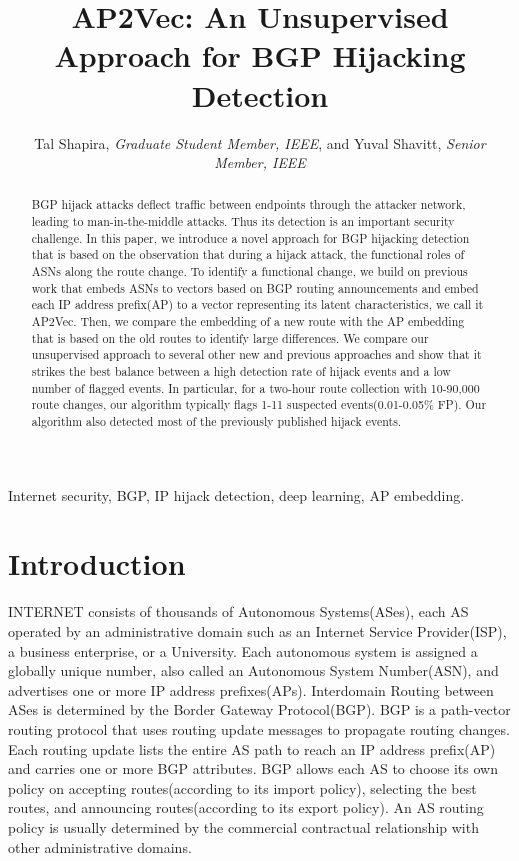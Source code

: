 \documentclass[10pt,journal]{IEEEtran}
\title{AP2Vec: An Unsupervised Approach for BGP Hijacking Detection}
\author{Tal Shapira, \textit{Graduate Student Member, IEEE}, and Yuval Shavitt, \textit{Senior Member, IEEE}}
\begin{document}
\maketitle

\begin{abstract}
BGP hijack attacks deflect traffic between endpoints through the attacker network, leading to man-in-the-middle attacks. Thus its detection is an important security challenge. In this paper, we introduce a novel approach for BGP hijacking detection that is based on the observation that during a hijack attack, the functional roles of ASNs along the route change. To identify a functional change, we build on previous work that embeds ASNs to vectors based on BGP routing announcements and embed each IP address prefix(AP) to a vector representing its latent characteristics, we call it AP2Vec. Then, we compare the embedding of a new route with the AP embedding that is based on the old routes to identify large differences. We compare our unsupervised approach to several other new and previous approaches and show that it strikes the best balance between a high detection rate of hijack events and a low number of flagged events. In particular, for a two-hour route collection with 10-90,000 route changes, our algorithm typically flags 1-11 suspected events(0.01-0.05\% FP). Our algorithm also detected most of the previously published hijack events.
\end{abstract}

\begin{IEEEkeywords}
Internet security, BGP, IP hijack detection, deep learning, AP embedding.
\end{IEEEkeywords}

\section{Introduction}
 INTERNET consists of thousands of Autonomous Systems(ASes), each AS operated by an administrative domain such as an Internet Service Provider(ISP), a business enterprise, or a University. Each autonomous system is assigned a globally unique number, also called an Autonomous System Number(ASN), and advertises one or more IP address prefixes(APs). Interdomain Routing between ASes is determined by the Border Gateway Protocol(BGP). BGP is a path-vector routing protocol that uses routing update messages to propagate routing changes. Each routing update lists the entire AS path to reach an IP address prefix(AP) and carries one or more BGP attributes. BGP allows each AS to choose its own policy on accepting routes(according to its import policy), selecting the best routes, and announcing routes(according to its export policy). An AS routing policy is usually determined by the commercial contractual relationship with other administrative domains.
\end{document}
